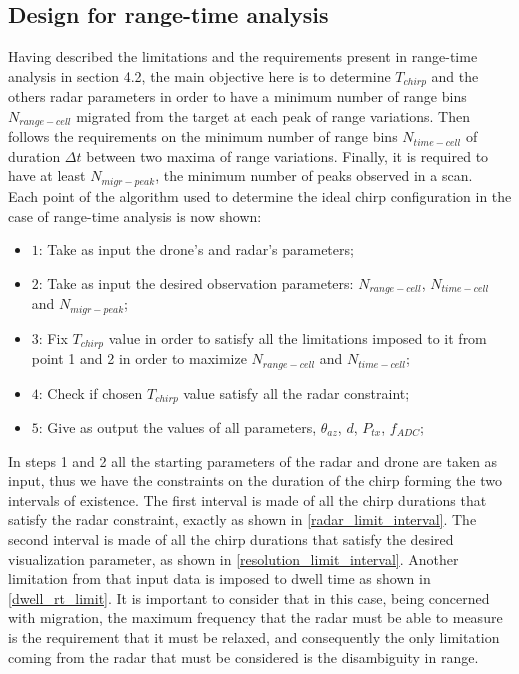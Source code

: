 \subsection{Design for range-time analysis}
Having described the limitations and the requirements present in range-time analysis in section 4.2, the main objective here is to determine $T_{chirp}$ and the others radar parameters in order to have a minimum number of range bins $N_{range-cell}$ migrated from the target at each peak of range variations. Then follows the requirements on the minimum number of range bins $N_{time-cell}$ of duration $\Delta t$ between two maxima of range variations. Finally, it is required to have at least $N_{migr-peak}$, the minimum number of peaks observed in a scan.\\
Each point of the algorithm used to determine the ideal chirp configuration in the case of range-time analysis is now shown:
\begin{itemize}
    \item $1$: Take as input the drone's and radar's parameters;
    
    \item $2$: Take as input the desired observation parameters: $N_{range-cell}$, $N_{time-cell}$ and $N_{migr-peak}$;
         
    \item $3$: Fix $T_{chirp}$ value in order to satisfy all the limitations imposed to it from point 1 and 2 in order to maximize $N_{range-cell}$ and $N_{time-cell}$;

    \item $4$: Check if chosen $T_{chirp}$ value satisfy all the radar constraint;
    
    \item $5$: Give as output the values of all parameters, $\theta_{az}$, $d$, $P_{tx}$, $f_{ADC}$;
    
\end{itemize}
In steps 1 and 2 all the starting parameters of the radar and drone are taken as input, thus we have the constraints on the duration of the chirp forming the two intervals of existence. The first interval is made of all the chirp durations that satisfy the radar constraint, exactly as shown in \ref{radar_limit_interval}. The second interval is made of all the chirp durations that satisfy the desired visualization parameter, as shown in \ref{resolution_limit_interval}. Another limitation from that input data is imposed to dwell time as shown in \ref{dwell_rt_limit}. It is important to consider that in this case, being concerned with migration, the maximum frequency that the radar must be able to measure is the requirement that it must be relaxed, and consequently the only limitation coming from the radar that must be considered is the disambiguity in range.\\
